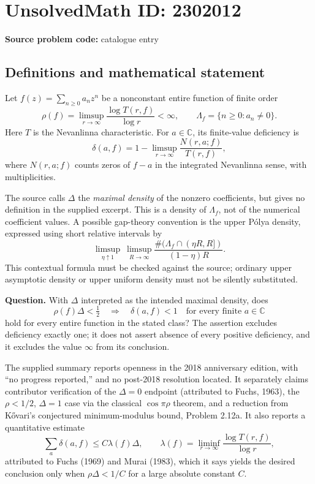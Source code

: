 \documentclass[11pt]{article}
\newcommand{\C}{\mathbb{C}}
\begin{document}
\section*{UnsolvedMath ID: 2302012}
\textbf{Source problem code:} catalogue entry
\subsection{Definitions and mathematical statement}
Let $f(z)=\sum_{n\geq0}a_nz^n$ be a nonconstant entire function of finite order
\[
 \rho(f)=\limsup_{r\to\infty}\frac{\log T(r,f)}{\log r}<\infty,
 \qquad \Lambda_f=\{n\geq0:a_n\ne0\}.
\]
Here $T$ is the Nevanlinna characteristic. For $a\in\C$, its finite-value deficiency is
\[
 \delta(a,f)=1-\limsup_{r\to\infty}\frac{N(r,a;f)}{T(r,f)},
\]
where $N(r,a;f)$ counts zeros of $f-a$ in the integrated Nevanlinna sense, with multiplicities.

The source calls $\Delta$ the \emph{maximal density} of the nonzero coefficients, but gives no definition in the supplied excerpt. This is a density of $\Lambda_f$, not of the numerical coefficient values. A possible gap-theory convention is the upper P\'olya density, expressed using short relative intervals by
\[
 \limsup_{\eta\uparrow1}\ \limsup_{R\to\infty}
 \frac{\#(\Lambda_f\cap(\eta R,R])}{(1-\eta)R}.
\]
This contextual formula must be checked against the source; ordinary upper asymptotic density or upper uniform density must not be silently substituted.

\textbf{Question.} With $\Delta$ interpreted as the intended maximal density, does
\[
 \rho(f)\Delta<\tfrac12
 \quad\Longrightarrow\quad
 \delta(a,f)<1\quad\text{for every finite }a\in\C
\]
hold for every entire function in the stated class? The assertion excludes deficiency exactly one; it does not assert absence of every positive deficiency, and it excludes the value $\infty$ from its conclusion.

The supplied summary reports openness in the 2018 anniversary edition, with ``no progress reported,'' and no post-2018 resolution located. It separately claims contributor verification of the $\Delta=0$ endpoint (attributed to Fuchs, 1963), the $\rho<1/2$, $\Delta=1$ case via the classical $\cos\pi\rho$ theorem, and a reduction from K\H{o}vari's conjectured minimum-modulus bound, Problem 2.12a. It also reports a quantitative estimate
\[
 \sum_a\delta(a,f)\leq C\lambda(f)\Delta,
 \qquad \lambda(f)=\liminf_{r\to\infty}\frac{\log T(r,f)}{\log r},
\]
attributed to Fuchs (1969) and Murai (1983), which it says yields the desired conclusion only when $\rho\Delta<1/C$ for a large absolute constant $C$.
\end{document}
